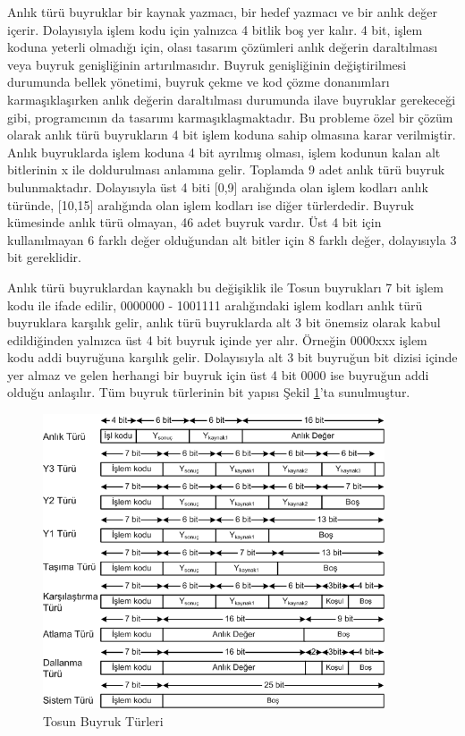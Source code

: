 Anlık türü buyruklar bir kaynak yazmacı, bir hedef yazmacı ve bir anlık değer içerir. Dolayısıyla işlem kodu için yalnızca 4 bitlik boş yer kalır. 4 bit, işlem koduna yeterli olmadığı için, olası tasarım çözümleri anlık değerin daraltılması veya buyruk genişliğinin artırılmasıdır. Buyruk genişliğinin değiştirilmesi durumunda bellek yönetimi, buyruk çekme ve kod çözme donanımları karmaşıklaşırken anlık değerin daraltılması durumunda ilave buyruklar gerekeceği gibi, programcının da tasarımı karmaşıklaşmaktadır. Bu probleme özel bir çözüm olarak anlık türü buyrukların 4 bit işlem koduna sahip olmasına karar verilmiştir. Anlık buyruklarda işlem koduna 4 bit ayrılmış olması, işlem kodunun kalan alt bitlerinin x ile doldurulması anlamına gelir. Toplamda 9 adet anlık türü buyruk bulunmaktadır. Dolayısıyla üst 4 biti [0,9] aralığında olan işlem kodları anlık türünde, [10,15] aralığında olan işlem kodları ise diğer türlerdedir. Buyruk kümesinde anlık türü olmayan, 46 adet buyruk vardır. Üst 4 bit için kullanılmayan 6 farklı değer olduğundan alt bitler için 8 farklı değer, dolayısıyla 3 bit gereklidir. \par

Anlık türü buyruklardan kaynaklı bu değişiklik ile Tosun buyrukları 7 bit işlem kodu ile ifade edilir, 0000000 - 1001111 aralığındaki işlem kodları anlık türü buyruklara karşılık gelir, anlık türü buyruklarda alt 3 bit önemsiz olarak kabul edildiğinden yalnızca üst 4 bit buyruk içinde yer alır. Örneğin 0000xxx işlem kodu addi buyruğuna karşılık gelir. Dolayısıyla alt 3 bit buyruğun bit dizisi içinde yer almaz ve gelen herhangi bir buyruk için üst 4 bit 0000 ise buyruğun addi olduğu anlaşılır. Tüm buyruk türlerinin bit yapısı Şekil \ref{image:instructionTypes}'ta sunulmuştur. \par

\begin{figure}
\centering
\shorthandoff{=}
\includegraphics[width=0.9\textwidth]{gorsel/instructionTypes.png}
\shorthandoff{=}
\caption{Tosun Buyruk Türleri}
\label{image:instructionTypes}
\end{figure}

